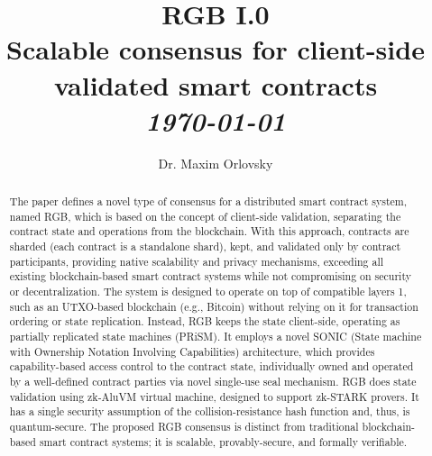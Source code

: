 \documentclass[9pt,oneside]{amsart}
\title[RGB I.0: Scalable consensus for client-side validated smart contracts]{RGB I.0\\Scalable consensus for client-side validated smart contracts\\ \it \today}
\author[M. Orlovsky]{Dr. Maxim Orlovsky}
\begin{document}
\pagecolor{yellow!10}

\begin{abstract}
The paper defines a novel type of consensus for a distributed smart contract system,
named RGB, which is based on the concept of client-side validation,
separating the contract state and operations from the blockchain.
With this approach, contracts are sharded (each contract is a standalone shard),
kept, and validated only by contract participants,
providing native scalability and privacy mechanisms,
exceeding all existing blockchain-based smart contract systems
while not compromising on security or decentralization.
The system is designed to operate on top of compatible layers 1,
such as an UTXO-based blockchain (e.g., Bitcoin)
without relying on it for transaction ordering or state replication.
Instead, RGB keeps the state client-side,
operating as partially replicated state machines (PRiSM).
It employs a novel SONIC (State machine with Ownership Notation Involving Capabilities)
architecture, which provides capability-based access control to the contract state,
individually owned and operated by a well-defined contract parties
via novel single-use seal mechanism.
RGB does state validation using zk-AluVM virtual machine,
designed to support zk-STARK provers.
It has a single security assumption of the collision-resistance hash function
and, thus, is quantum-secure.
The proposed RGB consensus is distinct from traditional
blockchain-based smart contract systems;
it is scalable, provably-secure, and formally verifiable.
\end{abstract}

\maketitle
\end{document}
